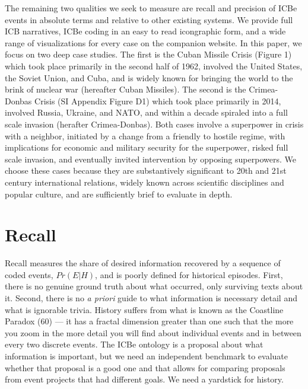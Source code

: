 \documentclass{article}
\begin{document}
The remaining two qualities we seek to measure are recall and precision
of ICBe events in absolute terms and relative to other existing systems.
We provide full ICB narratives, ICBe coding in an easy to read
icongraphic form, and a wide range of visualizations for every case on
the companion website. In this paper, we focus on two deep case studies.
The first is the Cuban Missile Crisis (Figure 1) which took place
primarily in the second half of 1962, involved the United States, the
Soviet Union, and Cuba, and is widely known for bringing the world to
the brink of nuclear war (hereafter Cuban Missiles). The second is the
Crimea-Donbas Crisis (SI Appendix Figure D1) which took place primarily
in 2014, involved Russia, Ukraine, and NATO, and within a decade
spiraled into a full scale invasion (herafter Crimea-Donbas). Both cases
involve a superpower in crisis with a neighbor, initiated by a change
from a friendly to hostile regime, with implications for economic and
military security for the superpower, risked full scale invasion, and
eventually invited intervention by opposing superpowers. We choose these
cases because they are substantively significant to 20th and 21st
century international relations, widely known across scientific
disciplines and popular culture, and are sufficiently brief to evaluate
in depth.

\hypertarget{recall}{%
\section*{Recall}\label{recall}}

Recall measures the share of desired information recovered by a sequence
of coded events, \(Pr(E|H)\), and is poorly defined for historical
episodes. First, there is no genuine ground truth about what occurred,
only surviving texts about it. Second, there is no \textit{a priori}
guide to what information is necessary detail and what is ignorable
trivia. History suffers from what is known as the Coastline Paradox (60)
--- it has a fractal dimension greater than one such that the more you
zoom in the more detail you will find about individual events and in
between every two discrete events. The ICBe ontology is a proposal about
what information is important, but we need an independent benchmark to
evaluate whether that proposal is a good one and that allows for
comparing proposals from event projects that had different goals. We
need a yardstick for history.
\end{document}
